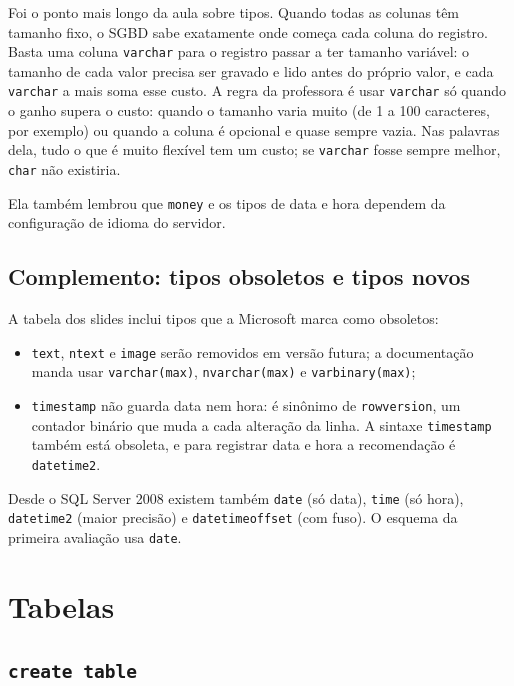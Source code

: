 Foi o ponto mais longo da aula sobre tipos.
Quando todas as colunas têm tamanho fixo, o SGBD sabe exatamente onde
começa cada coluna do registro. Basta uma coluna \texttt{varchar} para o
registro passar a ter tamanho variável: o tamanho de cada valor precisa
ser gravado e lido antes do próprio valor, e cada \texttt{varchar} a mais
soma esse custo. A regra da professora é usar \texttt{varchar} só quando
o ganho supera o custo: quando o tamanho varia muito (de 1 a 100
caracteres, por exemplo) ou quando a coluna é opcional e quase sempre
vazia. Nas palavras dela, tudo o que é muito flexível tem um custo; se
\texttt{varchar} fosse sempre melhor, \texttt{char} não existiria.

Ela também lembrou que \texttt{money} e os tipos de data e hora dependem
da configuração de idioma do servidor.

\subsection*{Complemento: tipos obsoletos e tipos novos}

A tabela dos slides inclui tipos que a Microsoft marca como obsoletos:

\begin{itemize}
	\item \texttt{text}, \texttt{ntext} e \texttt{image} serão removidos em
	versão futura; a documentação manda usar \texttt{varchar(max)},
	\texttt{nvarchar(max)} e \texttt{varbinary(max)};
	\item \texttt{timestamp} não guarda data nem hora: é sinônimo de
	\texttt{rowversion}, um contador binário que muda a cada alteração da
	linha. A sintaxe \texttt{timestamp} também está obsoleta, e para
	registrar data e hora a recomendação é
	\texttt{datetime2}.
\end{itemize}

Desde o SQL Server 2008 existem também \texttt{date} (só data),
\texttt{time} (só hora), \texttt{datetime2} (maior precisão) e
\texttt{datetimeoffset} (com fuso). O esquema da primeira avaliação usa
\texttt{date}.

\section{Tabelas}

\subsection{\texttt{create table}}

